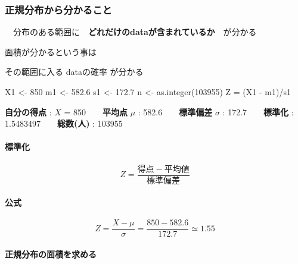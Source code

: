 \documentclass[
]{article}
\newenvironment{Shaded}{\begin{snugshade}}{\end{snugshade}}
\newcommand{\DecValTok}[1]{\textcolor[rgb]{0.00,0.00,0.81}{#1}}
\newcommand{\FloatTok}[1]{\textcolor[rgb]{0.00,0.00,0.81}{#1}}
\newcommand{\FunctionTok}[1]{\textcolor[rgb]{0.00,0.00,0.00}{#1}}
\newcommand{\NormalTok}[1]{#1}
\newcommand{\OtherTok}[1]{\textcolor[rgb]{0.56,0.35,0.01}{#1}}
\newcommand{\SpecialCharTok}[1]{\textcolor[rgb]{0.00,0.00,0.00}{#1}}
\begin{document}
\hypertarget{ux6b63ux898fux5206ux5e03ux304bux3089ux5206ux304bux308bux3053ux3068}{%
\subsubsection{正規分布から分かること}\label{ux6b63ux898fux5206ux5e03ux304bux3089ux5206ux304bux308bux3053ux3068}}

　分布のある範囲に　\textbf{どれだけのdataが含まれているか}　が分かる 　

面積が分かるという事は \textbar\textbar{}

その範囲に入る dataの確率 が分かる

\begin{Shaded}
\begin{Highlighting}[]
\NormalTok{X1 }\OtherTok{\textless{}{-}} \DecValTok{850}
\NormalTok{m1 }\OtherTok{\textless{}{-}} \FloatTok{582.6}
\NormalTok{s1 }\OtherTok{\textless{}{-}} \FloatTok{172.7}
\NormalTok{n }\OtherTok{\textless{}{-}} \FunctionTok{as.integer}\NormalTok{(}\DecValTok{103955}\NormalTok{)}
\NormalTok{Z }\OtherTok{=}\NormalTok{ (X1 }\SpecialCharTok{{-}}\NormalTok{ m1)}\SpecialCharTok{/}\NormalTok{s1}
\end{Highlighting}
\end{Shaded}

\textbf{自分の得点} : \(X\) = 850　\textbar{}　\textbf{平均点} \(\mu\) :
582.6　\textbar{}　\textbf{標準偏差} \(\sigma\) :
172.7　\textbar{}　\textbf{標準化} :
1.5483497　\textbar{}　\textbf{総数(人)} : 103955

\hypertarget{ux6a19ux6e96ux5316-1}{%
\paragraph{標準化}\label{ux6a19ux6e96ux5316-1}}

\[
Z = \frac{得点 - 平均値}{標準偏差}
\]

\hypertarget{ux516cux5f0f}{%
\paragraph{公式}\label{ux516cux5f0f}}

\[
Z = \frac{X - \mu}{\sigma} = \frac{850 - 582.6}{172.7} \simeq 1.55
\]

\hypertarget{ux6b63ux898fux5206ux5e03ux306eux9762ux7a4dux3092ux6c42ux3081ux308b}{%
\paragraph{正規分布の面積を求める}\label{ux6b63ux898fux5206ux5e03ux306eux9762ux7a4dux3092ux6c42ux3081ux308b}}
\end{document}
